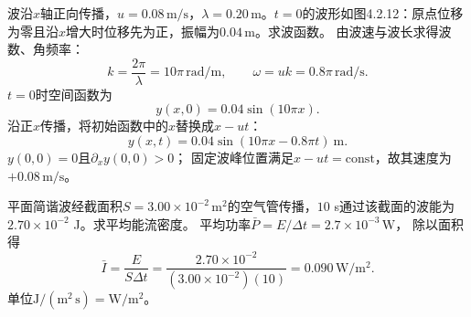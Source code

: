 \problemtext 波沿$x$轴正向传播，$u=0.08\,\mathrm{m/s}$，$\lambda=0.20\,\mathrm m$。$t=0$的波形如图4.2.12：原点位移为零且沿$x$增大时位移先为正，振幅为$0.04\,\mathrm m$。求波函数。
\workings
由波速与波长求得波数、角频率：
\[
k=\frac{2\pi}{\lambda}=10\pi\,\mathrm{rad/m},
\qquad
\omega=uk=0.8\pi\,\mathrm{rad/s}.
\]
$t=0$时空间函数为
\[
y(x,0)=0.04\sin(10\pi x).
\]
沿正$x$传播，将初始函数中的$x$替换成$x-ut$：
\[
\boxed{y(x,t)=0.04\sin(10\pi x-0.8\pi t)\ \mathrm m}.
\]
\crosscheck $y(0,0)=0$且$\partial_x y(0,0)>0$；
固定波峰位置满足$x-ut=\mathrm{const}$，故其速度为$+0.08\,\mathrm{m/s}$。

\problemtext 平面简谐波经截面积$S=3.00\times10^{-2}\,\mathrm{m^2}$的空气管传播，$10$ s通过该截面的波能为$2.70\times10^{-2}$ J。求平均能流密度。
\workings
平均功率$\bar P=E/\Delta t=2.7\times10^{-3}\,\mathrm W$，
除以面积得
\[
\boxed{\bar I=\frac{E}{S\Delta t}
=\frac{2.70\times10^{-2}}{(3.00\times10^{-2})(10)}
=0.090\,\mathrm{W/m^2}}.
\]
\crosscheck 单位$\mathrm J/(\mathrm{m^2\,s})=\mathrm{W/m^2}$。
